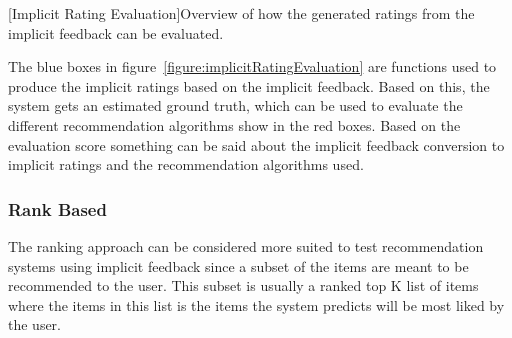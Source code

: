 \begin{center}
    [Implicit Rating Evaluation]{Overview of how the generated ratings from the implicit feedback can be evaluated.}
  	\label{figure:implicitRatingEvaluation}
  \end{center}

	The blue boxes in figure~\ref{figure:implicitRatingEvaluation} are functions used to produce the implicit ratings based on the implicit feedback.
	Based on this, the system gets an estimated ground truth, which can be used to evaluate the different recommendation algorithms show in the red boxes.
	Based on the evaluation score something can be said about the implicit feedback conversion to implicit ratings and the recommendation algorithms used.

\subsubsection{Rank Based} %
	\label{par:Ranking_based}
	The ranking approach can be considered more suited to test recommendation systems using implicit feedback since a subset of the items are meant to be recommended to the user.
	This subset is usually a ranked top K list of items where the items in this list is the items the system predicts will be most liked by the user.

